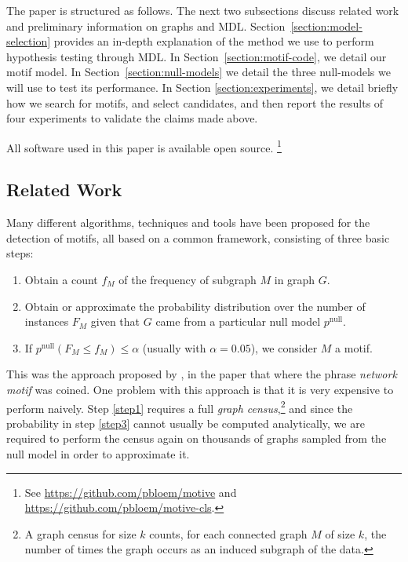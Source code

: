 \documentclass[twoside,11pt]{article}
\begin{document}
The paper is structured as follows. The next two subsections discuss related work and preliminary information on graphs and MDL. Section~\ref{section:model-selection} provides an in-depth explanation of the method we use to perform hypothesis testing through MDL. In Section~\ref{section:motif-code}, we detail our motif model. In Section~\ref{section:null-models} we detail the three null-models we will use to test its performance. In Section \ref{section:experiments}, we detail briefly how we search for motifs, and select candidates, and then report the results of four experiments to validate the claims made above.

All software used in this paper is available open source. \footnote{See \url{https://github.com/pbloem/motive} and \url{https://github.com/pbloem/motive-cls}.} 

\subsection{Related Work}
Many different algorithms, techniques and tools have been proposed for the detection of motifs, all based on a common framework, consisting of three basic steps:

\begin{enumerate}
  \item Obtain a count $f_M$ of the frequency of subgraph $M$ in graph $G$. \label{step1}
  \item Obtain or approximate the probability distribution over the number of instances $F_M$ given that $G$ came from a particular null model $p^\text{null}$.  \label{step2}
  \item If $p^\text{null}(F_M \leq f_M) \leq \alpha$ (usually with $\alpha = 0.05$), we consider $M$ a motif. \label{step3}
\end{enumerate} 

\noindent This was the approach proposed by \cite{milo2002network}, in the paper that where the phrase \emph{network motif} was coined. One problem with this approach is that it is very expensive to perform naively. Step \ref{step1} requires a full \emph{graph census},\footnote{A graph census for size $k$ counts, for each connected graph $M$ of size $k$, the number of times the graph occurs as an induced subgraph of the data.} and since the probability in step \ref{step3} cannot usually be computed analytically, we are required to perform the census again on thousands of graphs sampled from the null model in order to approximate it. 
\end{document}
